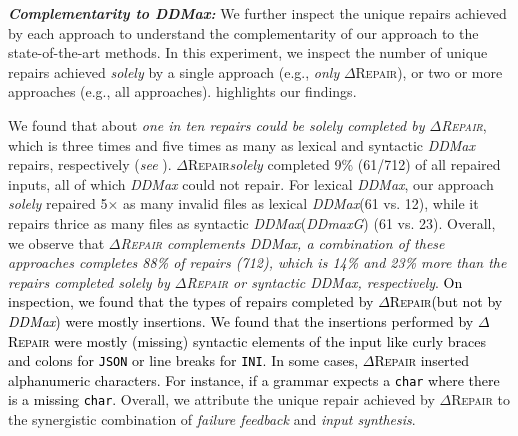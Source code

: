 \documentclass[acmsmall,screen,review,anonymous]{acmart}
\newcommand{\revise}[1]{\textcolor{black}{#1}}
\newcommand{\approach}{\textsc{$\Delta$Repair}\xspace}
\newcommand{\ddmax}{\textit{DDMax}\xspace}
\newcommand{\ddmaxg}{\textit{DDmaxG}\xspace}
\begin{document}
\noindent \textbf{\textit{Complementarity to \ddmax:}} We further inspect the unique repairs achieved by each approach %
to understand the complementarity of our approach to the state-of-the-art methods. In this experiment, we inspect the number of unique repairs achieved \textit{solely} by a single approach (e.g., \textit{only} \approach), or two or more approaches (e.g., all approaches). 
 highlights our findings. 

We found that about \textit{one in ten repairs could be solely completed by \approach}, which is three times and five times as many as lexical and syntactic \ddmax %
repairs, respectively (\textit{see} ).
\approach \textit{solely} completed 9\% (61/712) of all repaired inputs, all of
which \ddmax could not repair. For lexical \ddmax, our approach \textit{solely}
repaired 5$\times$ as many invalid files as lexical \ddmax (61 vs. 12), while
it repairs thrice as many files as syntactic \ddmax (\ddmaxg) (61 vs. 23). Overall, we observe that \textit{\approach complements \ddmax, a combination of these approaches completes 88\% of repairs (712), which is 14\% and 23\% more than the repairs completed \textit{solely} by \approach or syntactic \ddmax, respectively}. 
\revise{On inspection, we found that the types of repairs completed by \approach (but not by \ddmax) were mostly insertions. We found that the insertions performed by \approach were mostly (missing) syntactic elements of the input like curly braces and colons for \texttt{JSON} or line breaks for \texttt{INI}. In some cases, \approach inserted alphanumeric characters. For instance, if a grammar expects a \texttt{char} where there is a missing \texttt{char}.} 
Overall, we attribute the unique repair achieved by \approach to the synergistic combination of \textit{failure feedback} and \textit{input synthesis}. %
\end{document}
